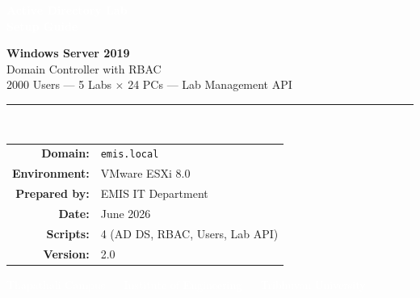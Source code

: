 ﻿\documentclass[12pt,a4paper]{article}
\begin{document}
\begin{titlepage}

\vspace*{1cm}
\begin{center}
    {\Huge\bfseries\textcolor{white}{Active Directory Lab}}\\[6pt]
    {\Huge\bfseries\textcolor{white}{Setup Guide}}\\[30pt]
\end{center}

\vspace{3cm}

\begin{center}
    {\LARGE\bfseries\textcolor{emisblue}{Windows Server 2019}}\\[10pt]
    {\LARGE\textcolor{emisdark}{Domain Controller with RBAC}}\\[8pt]
    {\large\textcolor{emisdark}{2000 Users --- 5 Labs $\times$ 24 PCs --- Lab Management API}}\\[40pt]

    \textcolor{emisblue}{\rule{0.6\textwidth}{1pt}}\\[20pt]

    {\large
    \begin{tabular}{rl}
        \textbf{Domain:}       & \texttt{emis.local} \\[4pt]
        \textbf{Environment:}  & VMware ESXi 8.0 \\[4pt]
        \textbf{Prepared by:}  & EMIS IT Department \\[4pt]
        \textbf{Date:}         & June 2026 \\[4pt]
        \textbf{Scripts:}       & 4 (AD DS, RBAC, Users, Lab API) \\[4pt]
        \textbf{Version:}      & 2.0 \\
    \end{tabular}
    }
\end{center}

\vfill
\begin{center}
    \textcolor{white}{\small Thapathali Campus --- Institute of Engineering --- Tribhuvan University}
\end{center}
\end{titlepage}
\end{document}
